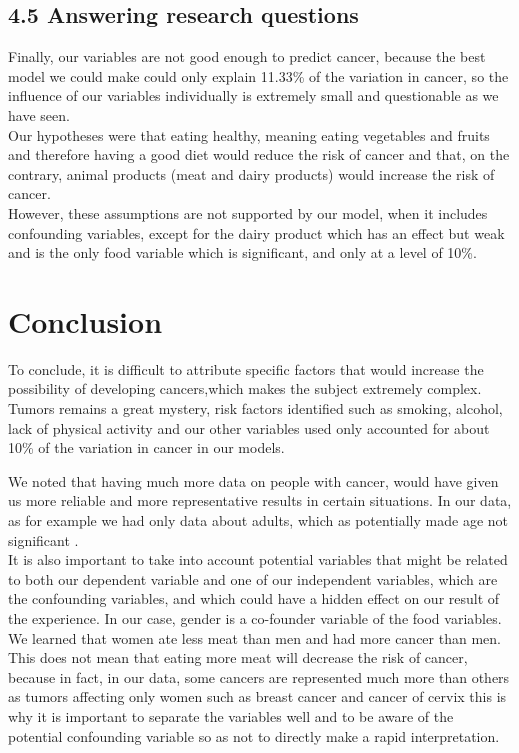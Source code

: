 \documentclass[
]{article}
\begin{document}
\hypertarget{answering-research-questions}{%
\subsection{4.5 Answering research
questions}\label{answering-research-questions}}

Finally, our variables are not good enough to predict cancer, because
the best model we could make could only explain 11.33\% of the variation
in cancer, so the influence of our variables individually is extremely
small and questionable as we have seen.\\
Our hypotheses were that eating healthy, meaning eating vegetables and
fruits and therefore having a good diet would reduce the risk of cancer
and that, on the contrary, animal products (meat and dairy products)
would increase the risk of cancer.\\
However, these assumptions are not supported by our model, when it
includes confounding variables, except for the dairy product which has
an effect but weak and is the only food variable which is significant,
and only at a level of 10\%.

\hypertarget{conclusion}{%
\section{Conclusion}\label{conclusion}}

To conclude, it is difficult to attribute specific factors that would
increase the possibility of developing cancers,which makes the subject
extremely complex. Tumors remains a great mystery, risk factors
identified such as smoking, alcohol, lack of physical activity and our
other variables used only accounted for about 10\% of the variation in
cancer in our models.

We noted that having much more data on people with cancer, would have
given us more reliable and more representative results in certain
situations. In our data, as for example we had only data about adults,
which as potentially made age not significant .\\
It is also important to take into account potential variables that might
be related to both our dependent variable and one of our independent
variables, which are the confounding variables, and which could have a
hidden effect on our result of the experience. In our case, gender is a
co-founder variable of the food variables. We learned that women ate
less meat than men and had more cancer than men. This does not mean that
eating more meat will decrease the risk of cancer, because in fact, in
our data, some cancers are represented much more than others as tumors
affecting only women such as breast cancer and cancer of cervix this is
why it is important to separate the variables well and to be aware of
the potential confounding variable so as not to directly make a rapid
interpretation.
\end{document}
